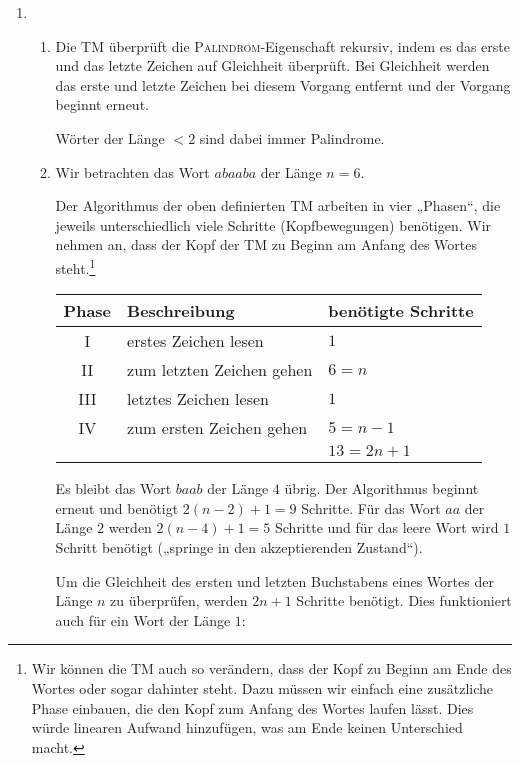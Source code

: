 \begin{enumerate}
  \item
    \begin{enumerate}
      \item Die TM überprüft die \textsc{Palindrom}-Eigenschaft rekursiv, indem
        es das erste und das letzte Zeichen auf Gleichheit überprüft. Bei
        Gleichheit werden das erste und letzte Zeichen bei diesem Vorgang
        entfernt und der Vorgang beginnt erneut.

        Wörter der Länge $< 2$ sind dabei immer Palindrome.

      \item Wir betrachten das Wort $abaaba$ der Länge $n = 6$.

        Der Algorithmus der oben definierten TM arbeiten in vier „Phasen“, die
        jeweils unterschiedlich viele Schritte (Kopfbewegungen) benötigen.
        Wir nehmen an, dass der Kopf der TM zu Beginn am Anfang des Wortes
        steht.\footnote{Wir können die TM auch so verändern, dass der Kopf zu
        Beginn am Ende des Wortes oder sogar dahinter steht. Dazu müssen wir
        einfach eine zusätzliche Phase einbauen, die den Kopf zum Anfang des
        Wortes laufen lässt. Dies würde linearen Aufwand hinzufügen, was am Ende
        keinen Unterschied macht.}

        \begin{tabular}{cll}
          Phase & Beschreibung & benötigte Schritte\\
          \midrule
          I & erstes Zeichen lesen & $1$\\
          II & zum letzten Zeichen gehen & $6 = n$\\
          III & letztes Zeichen lesen & $1$\\
          IV & zum ersten Zeichen gehen & $5 = n-1$\\
          \midrule
          & & $13 = 2n+1$\\
          \bottomrule
        \end{tabular}

        Es bleibt das Wort $baab$ der Länge $4$ übrig. Der Algorithmus beginnt
        erneut und benötigt $2(n-2) + 1 = 9$ Schritte. Für das Wort $aa$ der
        Länge $2$ werden $2(n-4) + 1 = 5$ Schritte und für das leere Wort wird
        $1$ Schritt benötigt („springe in den akzeptierenden Zustand“).

        Um die Gleichheit des ersten und letzten Buchstabens eines Wortes der
        Länge $n$ zu überprüfen, werden $2n+1$ Schritte benötigt. Dies
        funktioniert auch für ein Wort der Länge $1$:


\end{enumerate}
\end{enumerate}
